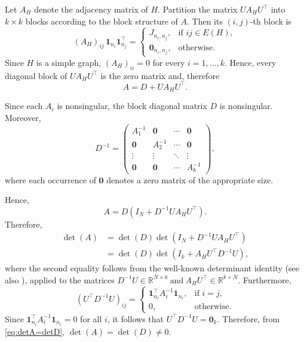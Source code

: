 \documentclass[12pt,reqno]{amsart}
\theoremstyle{definition}
\numberwithin{equation}{subsection}
\newenvironment{pf}{\proof}{\endproof}
\numberwithin{equation}{section}
\def\det{\operatorname{det}}
\begin{document}
\begin{pf}
Let $A_H$ denote the adjacency matrix of $H$. Partition the matrix \(UA_HU^\top\) into \(k\times k\) blocks according to the block structure of \(A\). Then its \((i,j)\)-th block is
\[
(A_H)_{ij}\,\mathbf{1}_{n_i}\mathbf{1}_{n_j}^\top
=
\begin{cases}
J_{n_i,n_j}, & \text{if } ij\in E(H),\\
\mathbf{0}_{n_i,n_j}, & \text{otherwise}.
\end{cases}
\]
Since \(H\) is a simple graph, \((A_H)_{ii}=0\) for every
\(i=1,\dots,k\). Hence, every diagonal block of
\(UA_HU^\top\) is the zero matrix and, therefore
\[
A=D+UA_HU^\top.
\]

Since each $A_i$ is nonsingular, the block diagonal matrix $D$ is nonsingular. Moreover,
\[
D^{-1}=
\begin{pmatrix}
A_1^{-1} & \mathbf{0} & \cdots & \mathbf{0} \\
\mathbf{0} & A_2^{-1} & \cdots & \mathbf{0} \\
\vdots & \vdots & \ddots & \vdots \\
\mathbf{0} & \mathbf{0} & \cdots & A_k^{-1}
\end{pmatrix},
\]
where each occurrence of $\mathbf{0}$ denotes a zero matrix of the appropriate size.

Hence,
\begin{equation}\label{eq:detA formula}
A=D(I_N+D^{-1}UA_HU^\top).
\end{equation}
Therefore,
\begin{equation}\label{eq:detA=detD}
\begin{aligned}
\det(A)
&=\det(D)\det(I_N+D^{-1}UA_HU^\top)\\
&=\det(D)\det(I_k+A_HU^\top D^{-1}U),
\end{aligned}
\end{equation}
where the second equality follows from the well-known determinant identity
\cite[Corollary~18.1.2]{harville} (see also \cite[Theorem~1.3.22]{inter}),
applied to the matrices
\(
D^{-1}U\in\mathbb{R}^{N\times k}
\ \text{and}\ 
A_HU^\top\in\mathbb{R}^{k\times N}.
\)
Furthermore, \[(U^\top D^{-1} U)_{ij}
=
\begin{cases}
\mathbf{1}_{n_i}^\top A_i^{-1} \mathbf{1}_{n_i}, & \text{if } i=j,\\
0, & \text{otherwise.}
\end{cases}\]
Since $\mathbf{1}_{n_i}^\top A_i^{-1} \mathbf{1}_{n_i}=0$ for all $i$, it follows that
\(
U^\top D^{-1} U = \mathbf{0}_k.
\)
Therefore, from \eqref{eq:detA=detD}, 
\(
\det(A) = \det(D)\ne 0.
\)



\end{pf}
\end{document}

